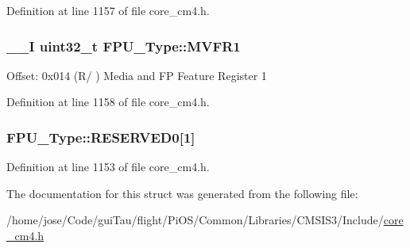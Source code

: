 Definition at line 1157 of file core\-\_\-cm4.\-h.

\hypertarget{struct_f_p_u___type_a776e8625853e1413c4e8330ec85c256d}{
\subsubsection[{M\-V\-F\-R1}]{\setlength{\rightskip}{0pt plus 5cm}\-\_\-\-\_\-\-I {\bf uint32\-\_\-t} F\-P\-U\-\_\-\-Type\-::\-M\-V\-F\-R1}}\label{struct_f_p_u___type_a776e8625853e1413c4e8330ec85c256d}
Offset\-: 0x014 (R/ ) Media and F\-P Feature Register 1 

Definition at line 1158 of file core\-\_\-cm4.\-h.

\hypertarget{struct_f_p_u___type_a7b2967b069046c8544adbbc1db143a36}{
\subsubsection[{R\-E\-S\-E\-R\-V\-E\-D0}]{ F\-P\-U\-\_\-\-Type\-::\-R\-E\-S\-E\-R\-V\-E\-D0\mbox{[}1\mbox{]}}}\label{struct_f_p_u___type_a7b2967b069046c8544adbbc1db143a36}


Definition at line 1153 of file core\-\_\-cm4.\-h.



The documentation for this struct was generated from the following file\-:\begin{DoxyCompactItemize}
\item 
/home/jose/\-Code/gui\-Tau/flight/\-Pi\-O\-S/\-Common/\-Libraries/\-C\-M\-S\-I\-S3/\-Include/\hyperlink{core__cm4_8h}{core\-\_\-cm4.\-h}\end{DoxyCompactItemize}
